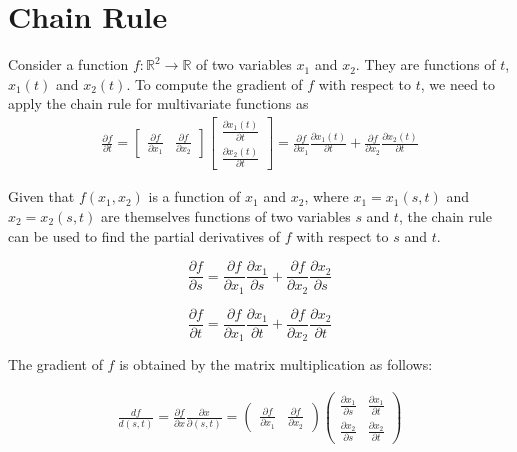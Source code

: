 \section{Chain Rule}

Consider a function $f: \mathbb{R}^2\to \mathbb{R}$ of two variables $x_1$ and $x_2$. They are functions of $t$, $x_1(t)$ and $x_2(t)$. To compute the gradient of $f$ with respect to $t$, we need to apply the chain rule for multivariate functions as 
\begin{align*}
	\frac{\partial f}{\partial t} = \begin{bmatrix}
		\frac{\partial f}{\partial x_1} & \frac{\partial f}{\partial x_2}
		\end{bmatrix}\begin{bmatrix}
		\frac{\partial x_1(t)}{\partial t}\\
		\frac{\partial x_2(t)}{\partial t}
	\end{bmatrix} = \frac{\partial f}{\partial x_1}\frac{\partial x_1(t)}{\partial t}+\frac{\partial f}{\partial x_2}\frac{\partial x_2(t)}{\partial t}
\end{align*}

Given that \( f(x_1, x_2) \) is a function of \( x_1 \) and \( x_2 \), where \( x_1 = x_1(s, t) \) and \( x_2 = x_2(s, t) \) are themselves functions of two variables \( s \) and \( t \), the chain rule can be used to find the partial derivatives of \( f \) with respect to \( s \) and \( t \).

\[ \frac{\partial f}{\partial s} = \frac{\partial f}{\partial x_1} \frac{\partial x_1}{\partial s} + \frac{\partial f}{\partial x_2} \frac{\partial x_2}{\partial s} \]

\[ \frac{\partial f}{\partial t} = \frac{\partial f}{\partial x_1} \frac{\partial x_1}{\partial t} + \frac{\partial f}{\partial x_2} \frac{\partial x_2}{\partial t} \]

The gradient of \( f \) is obtained by the matrix multiplication as follows:

\begin{align*}
\frac{d f}{d(s, t)} = \frac{\partial f}{\partial x} \frac{\partial x}{\partial (s, t)} = 
\begin{pmatrix}
\frac{\partial f}{\partial x_1} & \frac{\partial f}{\partial x_2}
\end{pmatrix}
\begin{pmatrix}
\frac{\partial x_1}{\partial s} & \frac{\partial x_1}{\partial t} \\
\frac{\partial x_2}{\partial s} & \frac{\partial x_2}{\partial t}
\end{pmatrix}
\end{align*}


